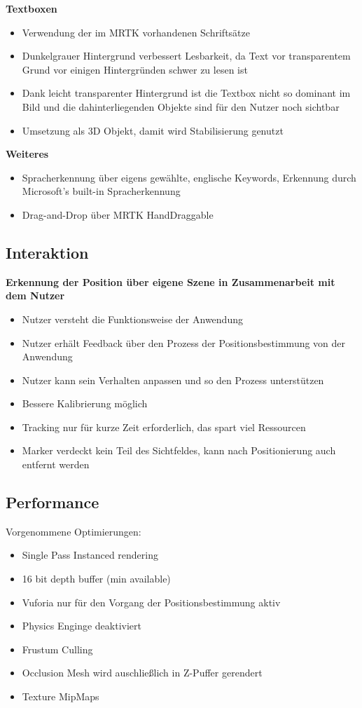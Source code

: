 \textbf{Textboxen}
\begin{itemize}
	\item Verwendung der im MRTK vorhandenen Schriftsätze
	\item Dunkelgrauer Hintergrund verbessert Lesbarkeit, da Text vor transparentem Grund vor einigen Hintergründen schwer zu lesen ist
	\item Dank leicht transparenter Hintergrund ist die Textbox nicht so dominant im Bild und die dahinterliegenden Objekte sind für den Nutzer noch sichtbar
	\item Umsetzung als 3D Objekt, damit wird Stabilisierung genutzt
\end{itemize}

\textbf{Weiteres}
\begin{itemize}
	\item Spracherkennung über eigens gewählte, englische Keywords, Erkennung durch Microsoft's built-in Spracherkennung
	\item Drag-and-Drop über MRTK HandDraggable 
\end{itemize}

\subsection{Interaktion}
\textbf{Erkennung der Position über eigene Szene in Zusammenarbeit mit dem Nutzer}
\begin{itemize}
	\item Nutzer versteht die Funktionsweise der Anwendung
	\item Nutzer erhält Feedback über den Prozess der Positionsbestimmung von der Anwendung
	\item Nutzer kann sein Verhalten anpassen und so den Prozess unterstützen
	\item Bessere Kalibrierung möglich
	\item Tracking nur für kurze Zeit erforderlich, das spart viel Ressourcen
	\item Marker verdeckt kein Teil des Sichtfeldes, kann nach Positionierung auch entfernt werden
\end{itemize}

\subsection{Performance}
Vorgenommene Optimierungen:
\begin{itemize}
	\item Single Pass Instanced rendering
	\item 16 bit depth buffer (min available)
	\item Vuforia nur für den Vorgang der Positionsbestimmung aktiv
	\item Physics Enginge deaktiviert
	\item Frustum Culling
	\item Occlusion Mesh wird auschließlich in Z-Puffer gerendert
	\item Texture MipMaps
\end{itemize}
